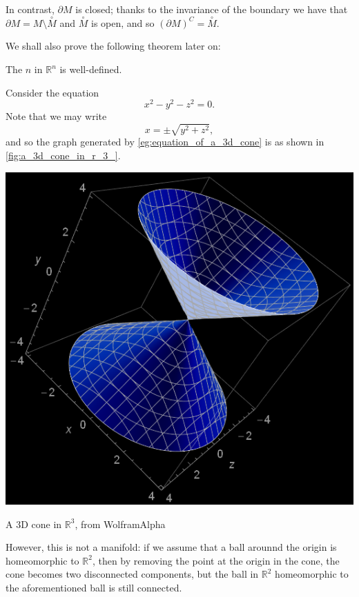 \documentclass[notoc,notitlepage]{tufte-book}
\newcommand{\Int}[1]{\overset{\circ}{#1}}
\begin{document}
\begin{note}
  In contrast, $\partial M$ is closed; thanks to the invariance of the boundary
  we have that $\partial M = M \setminus \Int{M}$ and $\Int{M}$ is open, and so
  $\left( \partial M \right)^C = \Int{M}$.
\end{note}

We shall also prove the following theorem later on:

\begin{thmnonum}\label{thmnonum:invariance_of_the_dimension}
  The $n$ in $\mathbb{R}^n$ is well-defined.
\end{thmnonum}

\begin{eg}
  Consider the equation
  \begin{equation}\label{eg:equation_of_a_3d_cone}
    x^2 - y^2 - z^2 = 0.
  \end{equation}
  Note that we may write
  \begin{equation*}
    x = \pm \sqrt{ y^2 + z^2 },
  \end{equation*}
  and so the graph generated by \cref{eg:equation_of_a_3d_cone} is as shown in
  \cref{fig:a_3d_cone_in_r_3_}.
  \begin{marginfigure}
    \centering
    \includegraphics[width=\marginparwidth]{3d_cone.png}
    \caption{A 3D cone in $\mathbb{R}^3$, from WolframAlpha}\label{fig:a_3d_cone_in_r_3_}
  \end{marginfigure}
  However, this is not a manifold: if we assume that a ball arounnd the origin
  is homeomorphic to $\mathbb{R}^2$, then by removing the point at the origin
  in the cone, the cone becomes two disconnected components, but the ball in
  $\mathbb{R}^2$ homeomorphic to the aforementioned ball is still connected.
\end{eg}
\end{document}
